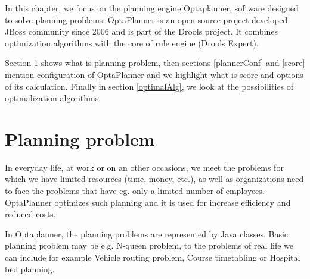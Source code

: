 In this chapter, we focus on the planning engine Optaplanner, software designed to solve planning problems. OptaPlanner is an open source project developed JBoss community since 2006 and is part of the Drools project. It combines optimization algorithms with the core of rule engine (Drools Expert).

Section \ref{planningProblem} shows what is planning problem, then sections \ref{plannerConf} and \ref{score} mention configuration of OptaPlanner and we highlight what is score and options of its calculation. Finally in section \ref{optimalAlg}, we look at the possibilities of optimalization algorithms.

\section{Planning problem}\label{planningProblem}
In everyday life, at work or on an other occasions, we meet the problems for which we have limited resources (time, money, etc.), as well as organizations need to face the problems that have eg. only a limited number of employees. OptaPlanner optimizes such planning and it is used for increase efficiency and reduced costs.

In Optaplanner, the planning problems are represented by Java classes. Basic planning problem may be e.g. N-queen problem, to the problems of real life we can include for example Vehicle routing problem, Course timetabling or Hospital bed planning.

